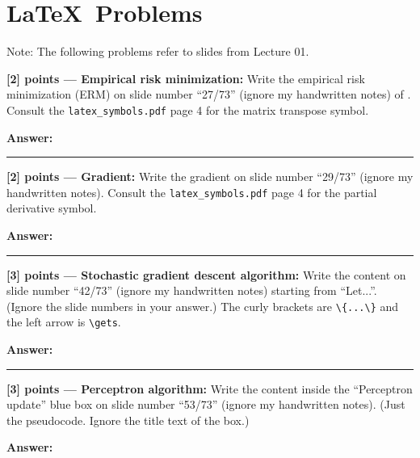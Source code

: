 \documentclass{article}
\newcommand{\mydivider}{\vspace{1em}\hrule\vspace{1em}}
\begin{document}
\section{\LaTeX~Problems}

Note: The following problems refer to slides from Lecture 01.

\vspace{1em}

\noindent\textbf{[2] points --- Empirical risk minimization:} Write the empirical risk minimization (ERM)
on slide number ``27/73''  (ignore my handwritten notes) of . Consult the \verb|latex_symbols.pdf| page 4 for the matrix transpose symbol.

\begin{tcolorbox}{}
\textbf{Answer: }


\end{tcolorbox}

\mydivider

\noindent\textbf{[2] points --- Gradient:} Write the gradient
on slide number ``29/73''  (ignore my handwritten notes).
Consult the
\verb|latex_symbols.pdf| page 4 for the partial derivative symbol.
\begin{tcolorbox}{}
\textbf{Answer: }


\end{tcolorbox}

\mydivider


\noindent\textbf{[3] points --- Stochastic gradient descent algorithm:} Write the
content on slide number ``42/73''  (ignore my handwritten notes) starting from ``Let...''. (Ignore the slide numbers in your answer.)
The curly brackets are \verb|\{...\}|
and the left arrow is \verb|\gets|.
\begin{tcolorbox}{}
\textbf{Answer: }


\end{tcolorbox}


\mydivider


\noindent\textbf{[3] points --- Perceptron algorithm:} Write the
content inside the ``Perceptron update'' blue box on slide number ``53/73''  (ignore my handwritten notes).
(Just the pseudocode. Ignore the title text of the box.)

\begin{tcolorbox}{}
\textbf{Answer: }


\end{tcolorbox}
\end{document}
